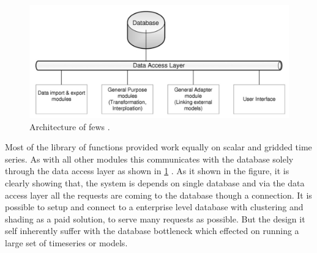 \begin{figure}[htp]
    \centering
    \includegraphics[width=1.0\textwidth]{lit/fews/Architecture-of-Delft-FEWS-showing-the-data-base-the-data-access-layers-and-examples-of_W640.png}
    \caption[Architecture of \acrshort{fews}]{Architecture of \acrshort{fews} \cite{Werner2013TheSystem}.}
    \label{fi:fews_data_layer}
\end{figure}
Most of the library of functions provided work equally on scalar and gridded time series. As with all other modules this communicates with the database solely through the data access layer as shown in \cref{fi:fews_data_layer} \cite{Werner2013TheSystem}. As it shown in the figure, it is clearly showing that, the system is depends on single database and via the data access layer all the requests are coming to the database though a connection. It is possible to setup and connect to a enterprise level database with clustering and shading as a paid solution, to serve many requests as possible. But the design it self inherently suffer with the database bottleneck which effected on running a large set of timeseries or models.

